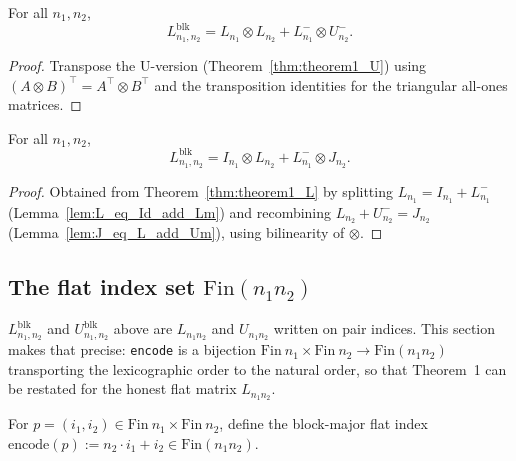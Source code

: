 \begin{theorem}
  \label{thm:theorem1_L}
  \leanok
  For all $n_1, n_2$,
  \[
    L^{\mathrm{blk}}_{n_1,n_2} = L_{n_1} \otimes L_{n_2} + L^-_{n_1} \otimes U^-_{n_2}.
  \]
\end{theorem}
\begin{proof}
  Transpose the U-version (Theorem~\ref{thm:theorem1_U}) using
  $(A \otimes B)^\top = A^\top \otimes B^\top$ and the transposition
  identities for the triangular all-ones matrices.
\end{proof}

\begin{theorem}
  \label{thm:theorem1_L'}
  \leanok
  For all $n_1, n_2$,
  \[
    L^{\mathrm{blk}}_{n_1,n_2} = I_{n_1} \otimes L_{n_2} + L^-_{n_1} \otimes J_{n_2}.
  \]
\end{theorem}
\begin{proof}
  Obtained from Theorem~\ref{thm:theorem1_L} by splitting
  $L_{n_1} = I_{n_1} + L^-_{n_1}$ (Lemma~\ref{lem:L_eq_Id_add_Lm}) and
  recombining $L_{n_2} + U^-_{n_2} = J_{n_2}$
  (Lemma~\ref{lem:J_eq_L_add_Um}), using bilinearity of $\otimes$.
\end{proof}

\subsection{The flat index set \texorpdfstring{$\mathrm{Fin}(n_1 n_2)$}{Fin (n1*n2)}}
\label{sec:flat}

$L^{\mathrm{blk}}_{n_1,n_2}$ and $U^{\mathrm{blk}}_{n_1,n_2}$ above are
$L_{n_1 n_2}$ and $U_{n_1 n_2}$ written on pair indices. This section
makes that precise: \texttt{encode} is a bijection
$\mathrm{Fin}\ n_1 \times \mathrm{Fin}\ n_2 \to \mathrm{Fin}(n_1 n_2)$
transporting the lexicographic order to the natural order, so that
Theorem~1 can be restated for the honest flat matrix $L_{n_1 n_2}$.

\begin{definition}
  \label{def:encode}
  \leanok
  For $p = (i_1, i_2) \in \mathrm{Fin}\ n_1 \times \mathrm{Fin}\ n_2$,
  define the block-major flat index
  $\mathrm{encode}(p) := n_2 \cdot i_1 + i_2 \in \mathrm{Fin}(n_1 n_2)$.
\end{definition}


